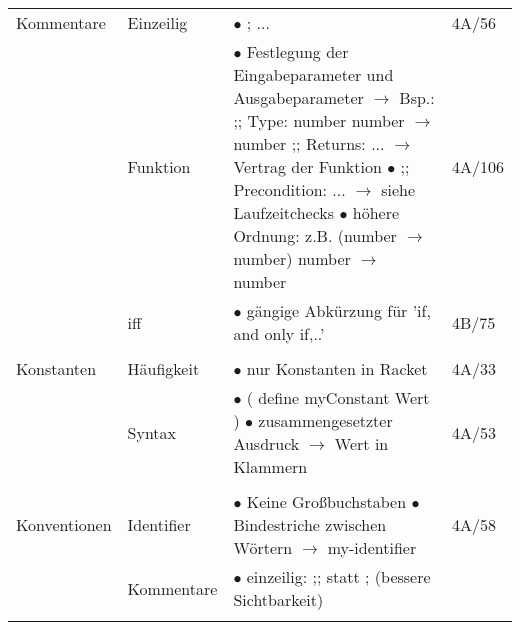 \documentclass[11pt,a4paper]{article}
\begin{document}
\begin{center}
\begin{longtable}[h]{ | p{3cm} | p{3cm} | p{11cm} | p{1.2cm} | }
	{\large Kommentare} & Einzeilig & $\bullet$ ; ... & 4A/56 \\ \cline{2-4}
	& Funktion & \makecell[l]{$\bullet$ Festlegung der Eingabeparameter und Ausgabeparameter \\ \hspace{0.4cm} $\rightarrow$ Bsp.: ;; Type: number number $\rightarrow$ number \\ 
	\hspace{1.9cm} ;; Returns: ... \\ \hspace{0.4cm} $\rightarrow$ Vertrag der Funktion \\ $\bullet$ ;; Precondition: ... $\rightarrow$ siehe Laufzeitchecks \\ 
	$\bullet$ höhere Ordnung: z.B. (number $\rightarrow$ number) number $\rightarrow$ number} & 4A/106 \\ \cline{2-4}
	& iff & $\bullet$ gängige Abkürzung für 'if, and only if,..' & 4B/75 \\
	\hline
	
	\multicolumn{3}{c}{} \\ 
	\hline 
	
	{\large Konstanten} & Häufigkeit & $\bullet$ nur Konstanten in Racket & 4A/33 \\ \cline{2-4}
	& Syntax & \makecell[l]{$\bullet$ ( define myConstant Wert ) \\ $\bullet$ zusammengesetzter Ausdruck $\rightarrow$ Wert in Klammern } & 4A/53  \\ 
	\hline
	
	\multicolumn{3}{c}{} \\ 
	\hline 	
	
	{\large Konventionen} & Identifier & \makecell[l]{$\bullet$ Keine Großbuchstaben \\ $\bullet$ Bindestriche zwischen Wörtern \\ 
	\hspace{0.4cm} $\rightarrow$ my-identifier } & 4A/58 \\ \cline{2-4}
	& Kommentare & $\bullet$ einzeilig: ;; statt ; (bessere Sichtbarkeit) &  \\  
	\hline
	
	\multicolumn{3}{c}{} \\ 
	\hline 	
	
	
	

\end{longtable}
\end{center}
\end{document}
